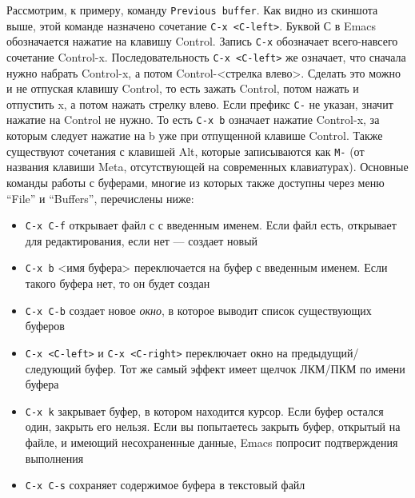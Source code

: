 \documentclass[a4paper, 12pt, titlepage, twoside]{article}
\begin{document}
Рассмотрим, к примеру, команду \texttt{Previous buffer}. Как видно из скиншота выше, этой команде назначено сочетание \verb|C-x <C-left>|. Буквой С в Emacs обозначается нажатие на клавишу Control. Запись \texttt{C-x} обозначает всего-навсего сочетание Control-x. Последовательность \verb|C-x <C-left>| же означает, что сначала нужно набрать Control-x, а потом Control-<стрелка влево>. Сделать это можно и не отпуская клавишу Control, то есть зажать Control, потом нажать и отпустить x, а потом нажать стрелку влево.
Если префикс \verb|С-| не указан, значит нажатие на Control не нужно. То есть \verb|С-х b| означает нажатие Control-x, за которым следует нажатие на b уже при отпущенной клавише Control. Также существуют сочетания с клавишей Alt, которые записываются как \verb|M-| (от названия клавиши Meta, отсутствующей на современных клавиатурах).
Основные команды работы с буферами, многие из которых также доступны через меню ``File'' и ``Buffers'', перечислены ниже:
\begin{itemize}
\item \verb|C-x C-f| открывает файл с с введенным именем. Если файл есть, открывает для редактирования, если нет --- создает новый
\item \verb|C-x b| <имя буфера> переключается на буфер с введенным именем. Если такого буфера нет, то он будет создан 
\item \verb|C-x C-b| создает новое \textit{окно}, в которое выводит список существующих буферов
\item \verb|C-x <C-left>| и \verb|C-x <C-right>| переключает окно на предыдущий/следующий буфер. Тот же самый эффект имеет щелчок ЛКМ/ПКМ по имени буфера
\item \verb|C-x k| закрывает буфер, в котором находится курсор. Если буфер остался один, закрыть его нельзя. Если вы попытаетесь закрыть буфер, открытый на файле, и имеющий несохраненные данные, Emacs попросит подтверждения выполнения
\item \verb|C-x C-s| сохраняет содержимое буфера в текстовый файл
\end{itemize}
\end{document}
